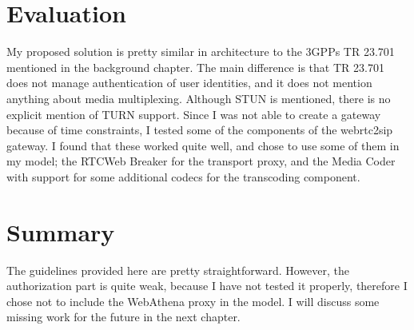 \section{Evaluation}
My proposed solution is pretty similar in architecture to the 3GPPs TR 23.701 mentioned in the background chapter. The main difference is that TR 23.701 does not manage authentication of user identities, and it does not mention anything about media multiplexing. Although STUN is mentioned, there is no explicit mention of TURN support. Since I was not able to create a gateway because of time constraints, I tested some of the components of the webrtc2sip gateway. I found that these worked quite well, and chose to use some of them in my model; the RTCWeb Breaker for the transport proxy, and the Media Coder with support for some additional codecs for the transcoding component.

\section{Summary}
The guidelines provided here are pretty straightforward. However, the authorization part is quite weak, because I have not tested it properly, therefore I chose not to include the WebAthena proxy in the model. I will discuss some missing work for the future in the next chapter. 